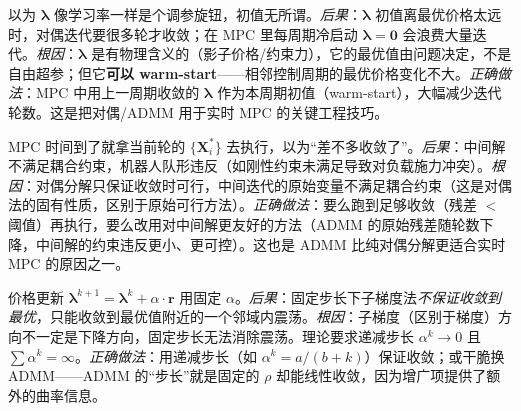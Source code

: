 \begin{pitfall}
以为 $\boldsymbol{\lambda}$ 像学习率一样是个调参旋钮，初值无所谓。\emph{后果}：$\boldsymbol{\lambda}$ 初值离最优价格太远时，对偶迭代要很多轮才收敛；在 MPC 里每周期冷启动 $\boldsymbol{\lambda}=\mathbf{0}$ 会浪费大量迭代。\emph{根因}：$\boldsymbol{\lambda}$ 是有物理含义的（影子价格/约束力），它的最优值由问题决定，不是自由超参；但它\textbf{可以 warm-start}——相邻控制周期的最优价格变化不大。\emph{正确做法}：MPC 中用上一周期收敛的 $\boldsymbol{\lambda}$ 作为本周期初值（warm-start），大幅减少迭代轮数。这是把对偶/ADMM 用于实时 MPC 的关键工程技巧。
\end{pitfall}

\begin{pitfall}
MPC 时间到了就拿当前轮的 $\{\mathbf{X}_i^*\}$ 去执行，以为“差不多收敛了”。\emph{后果}：中间解不满足耦合约束，机器人队形违反（如刚性约束未满足导致对负载施力冲突）。\emph{根因}：对偶分解只保证收敛时可行，中间迭代的原始变量不满足耦合约束（这是对偶法的固有性质，区别于原始可行方法）。\emph{正确做法}：要么跑到足够收敛（残差 $<$ 阈值）再执行，要么改用对中间解更友好的方法（ADMM 的原始残差随轮数下降，中间解的约束违反更小、更可控）。这也是 ADMM 比纯对偶分解更适合实时 MPC 的原因之一。
\end{pitfall}

\begin{pitfall}
价格更新 $\boldsymbol{\lambda}^{k+1}=\boldsymbol{\lambda}^k+\alpha\cdot \mathbf{r}$ 用固定 $\alpha$。\emph{后果}：固定步长下子梯度法\emph{不保证收敛到最优}，只能收敛到最优值附近的一个邻域内震荡。\emph{根因}：子梯度（区别于梯度）方向不一定是下降方向，固定步长无法消除震荡。理论要求递减步长 $\alpha^k\to0$ 且 $\sum\alpha^k=\infty$。\emph{正确做法}：用递减步长（如 $\alpha^k=a/(b+k)$）保证收敛；或干脆换 ADMM——ADMM 的“步长”就是固定的 $\rho$ 却能线性收敛，因为增广项提供了额外的曲率信息。
\end{pitfall}


